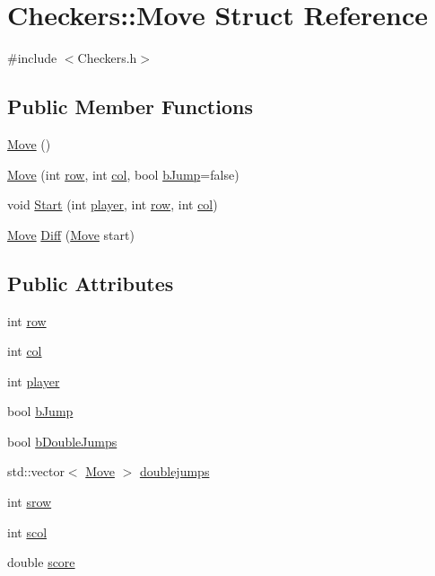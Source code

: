 \hypertarget{structCheckers_1_1Move}{\section{Checkers\-:\-:Move Struct Reference}
\label{structCheckers_1_1Move}
}


{\ttfamily \#include $<$Checkers.\-h$>$}

\subsection*{Public Member Functions}
\begin{DoxyCompactItemize}
\item 
\hyperlink{structCheckers_1_1Move_a60f00f24995512613aa98275bec58210}{Move} ()
\item 
\hyperlink{structCheckers_1_1Move_a8515cd0b6a9455950e811df92bceb090}{Move} (int \hyperlink{structCheckers_1_1Move_a2f318313b9288decf1144fcc8da4457f}{row}, int \hyperlink{structCheckers_1_1Move_ac78fddc38b24f19fe07c5cd61be59fb9}{col}, bool \hyperlink{structCheckers_1_1Move_a037e2f59611b937d8517454e98df3311}{b\-Jump}=false)
\item 
void \hyperlink{structCheckers_1_1Move_a0c905df569d2a84b74a23799e286d6c3}{Start} (int \hyperlink{structCheckers_1_1Move_a45735e4fab8cae7dc01f8ec8eba86679}{player}, int \hyperlink{structCheckers_1_1Move_a2f318313b9288decf1144fcc8da4457f}{row}, int \hyperlink{structCheckers_1_1Move_ac78fddc38b24f19fe07c5cd61be59fb9}{col})
\item 
\hyperlink{structCheckers_1_1Move}{Move} \hyperlink{structCheckers_1_1Move_ae52bcf1d81c9f69ddb4f3d300bdb2a2f}{Diff} (\hyperlink{structCheckers_1_1Move}{Move} start)
\end{DoxyCompactItemize}
\subsection*{Public Attributes}
\begin{DoxyCompactItemize}
\item 
int \hyperlink{structCheckers_1_1Move_a2f318313b9288decf1144fcc8da4457f}{row}
\item 
int \hyperlink{structCheckers_1_1Move_ac78fddc38b24f19fe07c5cd61be59fb9}{col}
\item 
int \hyperlink{structCheckers_1_1Move_a45735e4fab8cae7dc01f8ec8eba86679}{player}
\item 
bool \hyperlink{structCheckers_1_1Move_a037e2f59611b937d8517454e98df3311}{b\-Jump}
\item 
bool \hyperlink{structCheckers_1_1Move_a5626549bbd2a7d53ffe3ab183790a6c5}{b\-Double\-Jumps}
\item 
std\-::vector$<$ \hyperlink{structCheckers_1_1Move}{Move} $>$ \hyperlink{structCheckers_1_1Move_abc9f00e18c240b745872cbaf57f265fa}{doublejumps}
\item 
int \hyperlink{structCheckers_1_1Move_a3cf599693d1ee27b69d49fb60b55db0a}{srow}
\item 
int \hyperlink{structCheckers_1_1Move_a8bb137b74b8fef49def2fed2ad19d7ef}{scol}
\item 
double \hyperlink{structCheckers_1_1Move_a2fbd62e73c5906404f0153a17385a25f}{score}
\end{DoxyCompactItemize}
